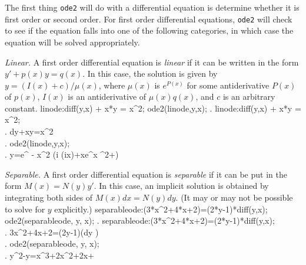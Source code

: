 The first thing \texttt{ode2} will do with a differential equation is
determine whether it is first order or second order.  For first order
differential equations, \texttt{ode2} will check to see if the
equation falls into one of the following categories, in which case the
equation will be solved appropriately.

\medskip

\noindent
\textit{Linear.}\quad
A first order differential equation is \textit{linear} if it can be
written in the form $y' + p(x)y = q(x)$.  In this case, the solution 
is given by $y=\left(I(x)+c\right)/\mu(x)$, where $\mu(x)$ is
$e^{P(x)}$ for some antiderivative $P(x)$ of $p(x)$, 
$I(x)$ is an antiderivative of $\mu(x)q(x)$,
and $c$ is an arbitrary constant.
\beginmaximasession
linode:diff(y,x) + x*y = x^2;
ode2(linode,y,x);
\maximatexsession
{}.  linode:diff(y,x) + x*y = x^2; \\
.   {{d}}\*y+x\*y=x^{2} \\
.  ode2(linode,y,x); \\
.   y=e^ {- {{x^{2}}} }\*\left({{\*\sqrt{\pi}\*i\*
 \left({{i\*x}}\right)}}+x\*e^{{{x
 ^{2}}}}+\right) \\
\endmaximasession

\smallskip

\noindent
\textit{Separable.}\quad
A first order differential equation is \textit{separable} if it can be
put in the form $M(x)=N(y)y'$.  In this case, an implicit solution is
obtained by integrating both sides of $M(x)dx = N(y)dy$.  (It may or
may not be possible to solve for $y$ explicitly.)
\beginmaximasession
separableode:(3*x^2+4*x+2)=(2*y-1)*diff(y,x);
ode2(separableode, y, x);
\maximatexsession
{}.  separableode:(3*x^2+4*x+2)=(2*y-1)*diff(y,x); \\
.   3\*x^{2}+4\*x+2=\left(2\*y-1\right)\*\left({{d}}\*y
 \right) \\
.  ode2(separableode, y, x); \\
.   y^{2}-y=x^{3}+2\*x^{2}+2\*x+ \\
\endmaximasession

\smallskip

